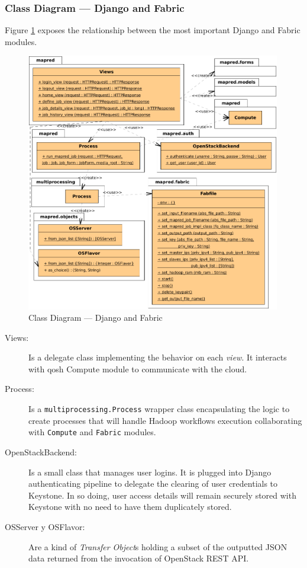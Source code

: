 \subsubsection{Class Diagram --- Django and Fabric}\label{subsubsec:clasesdjangofabric}
\noindent Figure \ref{fig:djangoyfabric} exposes the relationship between the most important Django and Fabric modules.

\begin{figure}[tbp]
\begin{center}
\includegraphics[width=0.99\textwidth]{imagenes/029.pdf}
 \caption{Class Diagram --- Django and Fabric}
\label{fig:djangoyfabric}
\end{center}
\end{figure}

\begin{description}
 \item[Views:] Is a delegate class implementing the behavior on each \emph{view}. It interacts with qosh Compute module to communicate with the cloud.
 \item[Process:] Is a \texttt{multiprocessing.Process} wrapper class encapsulating the logic to create processes that will handle Hadoop workflows execution collaborating with \texttt{Compute} and \texttt{Fabric} modules.
 \item[OpenStackBackend:] Is a small class that manages user logins. It is plugged into Django authenticating pipeline to delegate the clearing of user credentials to Keystone. In so doing, user access details will remain securely stored with Keystone with no need to have them duplicately stored.
 \item[OSServer y OSFlavor:] Are a kind of \emph{Transfer Object}s holding a subset of the outputted JSON data returned from the invocation of OpenStack REST API.
\end{description}

